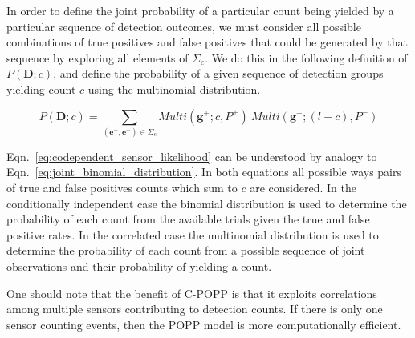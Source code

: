 In order to define the joint probability of a particular count being yielded by a particular sequence of detection outcomes, we must consider all possible combinations of true positives and false positives that could be generated by that sequence by exploring all elements of $\Sigma_c$. We do this in the following definition of $P(\mathbf{D} ; c)$, and define the probability of a given sequence of detection groups yielding count $c$ using the multinomial distribution.

\begin{equation}
\label{eq:codependent_sensor_likelihood}
P(\mathbf{D} ; c) = \sum\limits_{(\mathbf{e}^+, \mathbf{e}^-) \in \Sigma_c} Multi(\mathbf{g}^+ ; c, P^+) ~ Multi(\mathbf{g}^- ; (l - c), P^-)
\end{equation}

Eqn.~\ref{eq:codependent_sensor_likelihood} can be understood by analogy to Eqn.~\ref{eq:joint_binomial_distribution}. In both equations all possible ways pairs of true and false positives counts which sum to $c$ are considered. In the conditionally independent case the binomial distribution is used to determine the probability of each count from the available trials given the true and false positive rates. In the correlated case the multinomial distribution is used to determine the probability of each count from a possible sequence of joint observations and their probability of yielding a count.

One should note that the benefit of C-POPP is that it exploits correlations among multiple sensors contributing to detection counts. If there is only one sensor counting events, then the POPP model is more computationally efficient.


